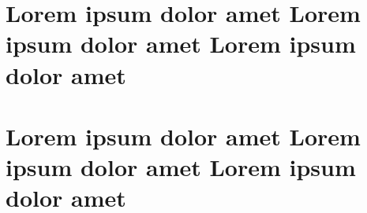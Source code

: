 \documentclass{article}
\begin{document}
\makeatletter
\let\old@sect\@sect
\def\@sect#1#2#3#4#5#6[#7]#8{%
  \ifnum #2>\c@secnumdepth
    \let\@svsec\@empty
  \else
    \refstepcounter{#1}%
    \protected@edef\@svsec{\@seccntformat{#1}\relax}%
  \fi
  \@tempskipa #5\relax
  \ifdim \@tempskipa>\z@
    \begingroup
      #6{%
        \global\setbox0=\vbox{\@hangfrom{\hskip #3\relax\@svsec}%
           #8\@@par}
        }%
        \vbadness=10000
        \splittopskip=0pt%
        \splitmaxdepth=0pt%
        \vsplit0 to \baselineskip%
        \vsplit0 to \baselineskip%
    \endgroup
    \csname #1mark\endcsname{#7}%
    \addcontentsline{toc}{#1}{%
      \ifnum #2>\c@secnumdepth \else
        \protect\numberline{\csname the#1\endcsname}%
      \fi
      #7}%
  \else
    \def\@svsechd{%
      #6{\hskip #3\relax
      \@svsec #8}%
      \csname #1mark\endcsname{#7}%
      \addcontentsline{toc}{#1}{%
        \ifnum #2>\c@secnumdepth \else
          \protect\numberline{\csname the#1\endcsname}%
        \fi
        #7}}%
  \fi
  \@xsect{#5}}

\section{Lorem ipsum dolor amet Lorem ipsum dolor amet Lorem ipsum dolor amet}

\let\@sect\old@sect
\section{Lorem ipsum dolor amet Lorem ipsum dolor amet Lorem ipsum dolor amet}
\end{document}

